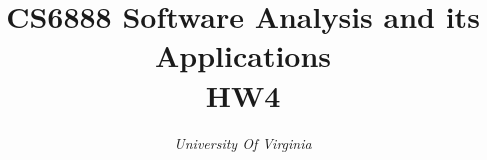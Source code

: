 \documentclass[conference]{IEEEtran}
\begin{document}
\title{CS6888 Software Analysis and its Applications \\ HW4\\
}

\author{
\textit{University Of Virginia}\\
}

\maketitle
\end{document}
